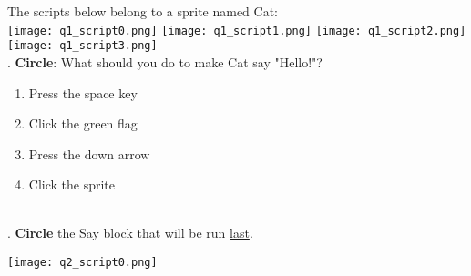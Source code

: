 \noindent The scripts below belong to a sprite named Cat: \\

\texttt{[image: q1\_script0.png]} \hspace{1cm}
\texttt{[image: q1\_script1.png]} \hspace{1cm}
\texttt{[image: q1\_script2.png]} \hspace{1cm}
\texttt{[image: q1\_script3.png]} \hspace{1cm} \\

. \textbf{Circle}: What should you do to make Cat say "Hello!"?
\renewcommand{\theenumi}{\Alph{enumi}}
\begin{enumerate}
\item Press the space key
\item Click the green flag
\item Press the down arrow
\item Click the sprite
\end{enumerate}

\noindent \dotfill \\

. \textbf{Circle} the Say block that will be run \underline{last}.  \\
\begin{center}
\texttt{[image: q2\_script0.png]}
\end{center}

\noindent \dotfill \\